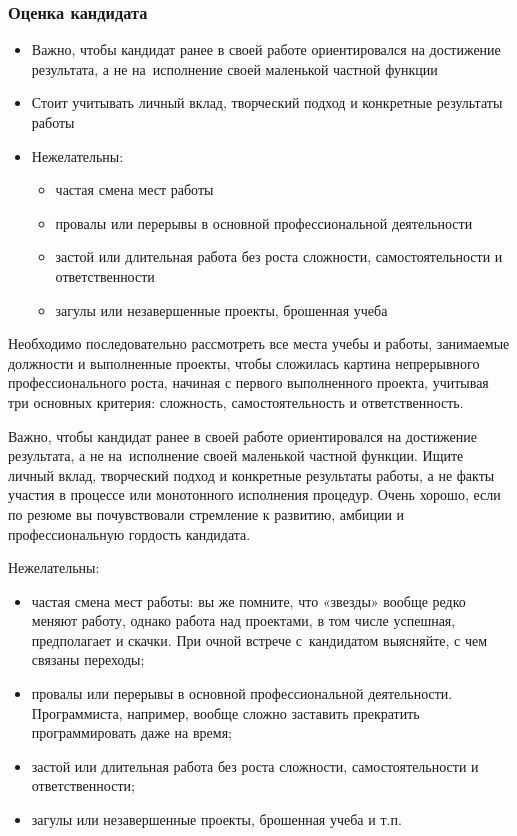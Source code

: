 \documentclass{../industrial-development}
\begin{document}
	
	\begin{frame} \frametitle{Оценка кандидата}
		\begin{itemize}
			
			\item Важно, чтобы кандидат ранее в своей работе ориентировался на достижение результата, а не на~исполнение своей маленькой частной функции
			\item Стоит учитывать личный вклад, творческий подход и конкретные результаты работы
			\item Нежелательны:
			\begin{itemize}
				\item частая смена мест работы
				\item	провалы или перерывы в основной профессиональной деятельности
				\item	застой или длительная работа без роста сложности, самостоятельности и ответственности
				\item загулы или незавершенные проекты, брошенная учеба
				
			\end{itemize}
		\end{itemize}
	\end{frame}
	
	\lecturenotes
	
	Необходимо последовательно рассмотреть все места учебы и работы, занимаемые должности и выполненные проекты, чтобы сложилась картина непрерывного профессионального роста, начиная с первого выполненного проекта, учитывая три основных критерия: сложность, самостоятельность и ответственность.
	
	Важно, чтобы кандидат ранее в своей работе ориентировался на достижение результата, а не на~исполнение своей маленькой частной функции. Ищите личный вклад, творческий подход и конкретные результаты работы, а не факты участия в процессе или монотонного исполнения процедур. Очень хорошо, если по резюме вы почувствовали стремление к развитию, амбиции и профессиональную гордость кандидата.
	
	Нежелательны:
	\begin{itemize}
		\item	частая смена мест работы: вы же помните, что «звезды» вообще редко меняют работу, однако работа над проектами, в том числе успешная, предполагает и скачки. При очной встрече с~кандидатом выясняйте, с чем связаны переходы;
		
		\item	провалы или перерывы в основной профессиональной деятельности. Программиста, например, вообще сложно заставить прекратить программировать даже на время;
		
		\item	застой или длительная работа без роста сложности, самостоятельности и ответственности;
		
		\item	загулы или незавершенные проекты, брошенная учеба и т.п.
	\end{itemize}
	
\end{document}
